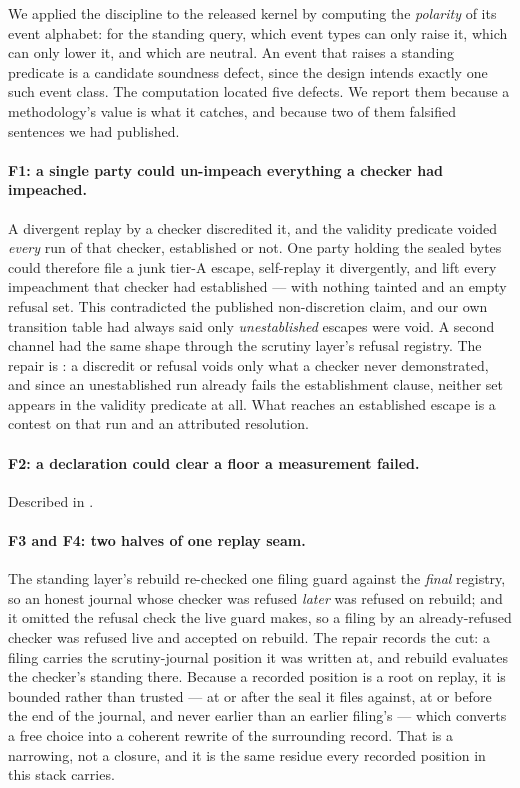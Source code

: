 \documentclass[11pt,a4paper]{article}
\theoremstyle{plain}
\theoremstyle{definition}
\theoremstyle{remark}
\begin{document}
We applied the discipline to the released kernel by computing the \emph{polarity} of its event alphabet: for the standing query, which event types can only raise it, which can only lower it, and which are neutral. An event that raises a standing predicate is a candidate soundness defect, since the design intends exactly one such event class. The computation located five defects. We report them because a methodology's value is what it catches, and because two of them falsified sentences we had published.

\paragraph{F1: a single party could un-impeach everything a checker had impeached.} A divergent replay by a checker discredited it, and the validity predicate voided \emph{every} run of that checker, established or not. One party holding the sealed bytes could therefore file a junk tier-A escape, self-replay it divergently, and lift every impeachment that checker had established --- with nothing tainted and an empty refusal set. This contradicted the published non-discretion claim, and our own transition table had always said only \emph{unestablished} escapes were void. A second channel had the same shape through the scrutiny layer's refusal registry. The repair is : a discredit or refusal voids only what a checker never demonstrated, and since an unestablished run already fails the establishment clause, neither set appears in the validity predicate at all. What reaches an established escape is a contest on that run and an attributed resolution.

\paragraph{F2: a declaration could clear a floor a measurement failed.} Described in .

\paragraph{F3 and F4: two halves of one replay seam.} The standing layer's rebuild re-checked one filing guard against the \emph{final} registry, so an honest journal whose checker was refused \emph{later} was refused on rebuild; and it omitted the refusal check the live guard makes, so a filing by an already-refused checker was refused live and accepted on rebuild. The repair records the cut: a filing carries the scrutiny-journal position it was written at, and rebuild evaluates the checker's standing there. Because a recorded position is a root on replay, it is bounded rather than trusted --- at or after the seal it files against, at or before the end of the journal, and never earlier than an earlier filing's --- which converts a free choice into a coherent rewrite of the surrounding record. That is a narrowing, not a closure, and it is the same residue every recorded position in this stack carries.
\end{document}
